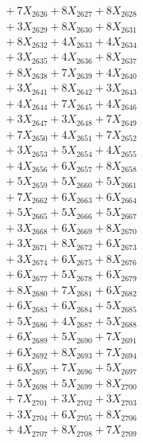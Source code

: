 \documentclass[a4paper,10pt]{article}
\begin{document}
{\begin{align}
&\;  + 7 X_{2626} + 8 X_{2627} + 8 X_{2628} \\[0.3ex]
&\;  + 3 X_{2629} + 8 X_{2630} + 8 X_{2631} \\[0.3ex]
&\;  + 8 X_{2632} + 4 X_{2633} + 4 X_{2634} \\[0.3ex]
&\;  + 3 X_{2635} + 4 X_{2636} + 8 X_{2637} \\[0.3ex]
&\;  + 8 X_{2638} + 7 X_{2639} + 4 X_{2640} \\[0.3ex]
&\;  + 3 X_{2641} + 8 X_{2642} + 3 X_{2643} \\[0.3ex]
&\;  + 4 X_{2644} + 7 X_{2645} + 4 X_{2646} \\[0.3ex]
&\;  + 3 X_{2647} + 3 X_{2648} + 7 X_{2649} \\[0.5ex]\allowbreak
&\;  + 7 X_{2650} + 4 X_{2651} + 7 X_{2652} \\[0.3ex]
&\;  + 3 X_{2653} + 5 X_{2654} + 4 X_{2655} \\[0.3ex]
&\;  + 4 X_{2656} + 6 X_{2657} + 8 X_{2658} \\[0.3ex]
&\;  + 5 X_{2659} + 5 X_{2660} + 5 X_{2661} \\[0.3ex]
&\;  + 7 X_{2662} + 6 X_{2663} + 6 X_{2664} \\[0.3ex]
&\;  + 5 X_{2665} + 5 X_{2666} + 5 X_{2667} \\[0.3ex]
&\;  + 3 X_{2668} + 6 X_{2669} + 8 X_{2670} \\[0.3ex]
&\;  + 3 X_{2671} + 8 X_{2672} + 6 X_{2673} \\[0.3ex]
&\;  + 3 X_{2674} + 6 X_{2675} + 8 X_{2676} \\[0.3ex]
&\;  + 6 X_{2677} + 5 X_{2678} + 6 X_{2679} \\[0.5ex]\allowbreak
&\;  + 8 X_{2680} + 7 X_{2681} + 6 X_{2682} \\[0.3ex]
&\;  + 6 X_{2683} + 6 X_{2684} + 5 X_{2685} \\[0.3ex]
&\;  + 5 X_{2686} + 4 X_{2687} + 5 X_{2688} \\[0.3ex]
&\;  + 6 X_{2689} + 5 X_{2690} + 7 X_{2691} \\[0.3ex]
&\;  + 6 X_{2692} + 8 X_{2693} + 7 X_{2694} \\[0.3ex]
&\;  + 6 X_{2695} + 7 X_{2696} + 5 X_{2697} \\[0.3ex]
&\;  + 5 X_{2698} + 5 X_{2699} + 8 X_{2700} \\[0.3ex]
&\;  + 7 X_{2701} + 3 X_{2702} + 3 X_{2703} \\[0.3ex]
&\;  + 3 X_{2704} + 6 X_{2705} + 8 X_{2706} \\[0.3ex]
&\;  + 4 X_{2707} + 8 X_{2708} + 7 X_{2709} \\[0.5ex]\allowbreak

\end{align}}
\end{document}

